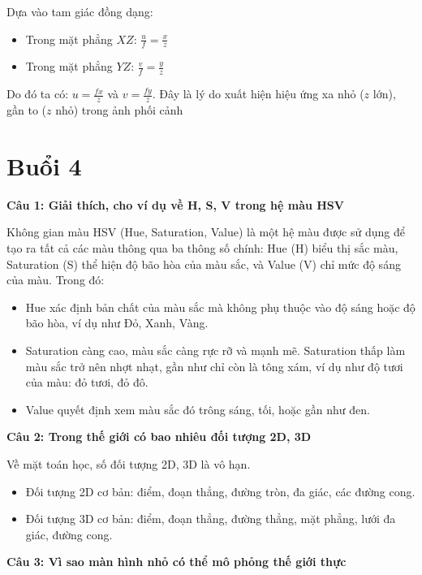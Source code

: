Dựa vào tam giác đồng dạng:
\begin{itemize}
	\item Trong mặt phẳng $XZ$: $\frac{u}{f} = \frac{x}{z}$
	\item Trong mặt phẳng $YZ$: $\frac{v}{f} = \frac{y}{z}$
\end{itemize}

Do đó ta có: $u = \frac{fx}{z}$ và $v = \frac{fy}{z}$. Đây là lý do xuất hiện hiệu ứng xa nhỏ ($z$ lớn), gần to ($z$ nhỏ) trong ảnh phối cảnh

\section{Buổi 4}

\textbf{Câu 1: Giải thích, cho ví dụ về H, S, V trong hệ màu HSV}

Không gian màu HSV (Hue, Saturation, Value) là một hệ màu được sử dụng để tạo ra tất cả các màu thông qua ba thông số chính: Hue (H) biểu thị sắc màu, Saturation (S) thể hiện độ bão hòa của màu sắc, và Value (V) chỉ mức độ sáng của màu. Trong đó:

\begin{itemize}
	\item Hue xác định bản chất của màu sắc mà không phụ thuộc vào độ sáng hoặc độ bão hòa, ví dụ như Đỏ, Xanh, Vàng.
	
	\item Saturation càng cao, màu sắc càng rực rỡ và mạnh mẽ. Saturation thấp làm màu sắc trở nên nhợt nhạt, gần như chỉ còn là tông xám, ví dụ như độ tươi của màu: đỏ tươi, đỏ đô.
	
	\item Value quyết định xem màu sắc đó trông sáng, tối, hoặc gần như đen.
\end{itemize}

\textbf{Câu 2: Trong thế giới có bao nhiêu đối tượng 2D, 3D}

Về mặt toán học, số đối tượng 2D, 3D là vô hạn.

\begin{itemize}
	\item Đối tượng 2D cơ bản: điểm, đoạn thẳng, đường tròn, đa giác, các đường cong.
	
	\item Đối tượng 3D cơ bản: điểm, đoạn thẳng, đường thẳng, mặt phẳng, lưới đa giác, đường cong.
\end{itemize}

\textbf{Câu 3: Vì sao màn hình nhỏ có thể mô phỏng thế giới thực}

